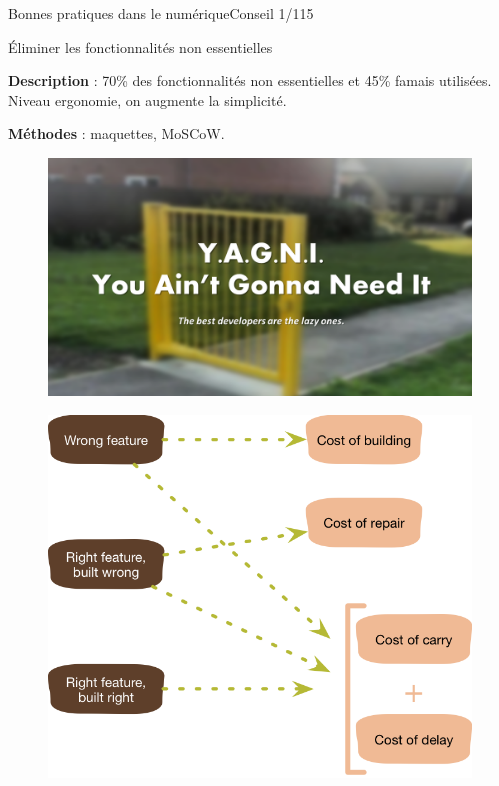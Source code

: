 
\begin{frame}{Bonnes pratiques dans le numérique}{Conseil 1/115}

\begin{block}{Éliminer les fonctionnalités non essentielles}

\textbf{Description} : 70\% des fonctionnalités non essentielles et 45\% famais utilisées.
Niveau ergonomie, on augmente la simplicité.

\textbf{Méthodes} : maquettes, MoSCoW.


\begin{minipage}[b]{0.5\linewidth}  
\begin{figure}
    \includegraphics[scale=0.12]{chapitre2/wdd1/fig/yagni.png}
    \centering
\end{figure}
\end{minipage}\hfill
\begin{minipage}[b]{0.5\linewidth}  
\begin{figure}
    \centering
    \includegraphics[scale=0.22]{chapitre2/wdd1/fig/sketch.png}
\end{figure}
\end{minipage}\hfill

\end{block}
\end{frame}

